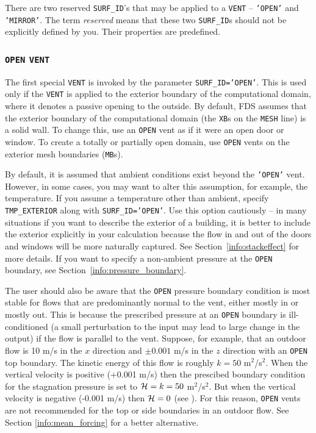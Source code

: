 \documentclass[11pt]{book}
\newcommand{\ct}{\tt\small}
\begin{document}
There are two reserved {\ct SURF\_ID}'s that may be applied to a {\ct VENT} -- {\ct 'OPEN'} and {\ct 'MIRROR'}. The term {\em reserved} means that these two
{\ct SURF\_ID}s should not be explicitly defined by you. Their properties are predefined.

\subsubsection{\texorpdfstring{{\tt OPEN}}{OPEN} \texorpdfstring{{\tt VENT}}{VENT}}

The first special {\ct VENT} is invoked by the parameter {\ct SURF\_ID='OPEN'}. This is used only if the {\ct VENT} is applied to the exterior boundary of the computational domain, where it denotes a passive opening to the outside. By default, FDS assumes that the exterior boundary of the computational domain (the {\ct XB}s on the {\ct MESH} line) is a solid wall. To change this, use an {\ct OPEN} vent as if it were an open door or window. To create a totally or partially open domain, use {\ct OPEN} vents on the exterior mesh boundaries ({\ct MB}s).

By default, it is assumed that ambient conditions exist beyond the {\ct 'OPEN'} vent. However, in some cases, you may want to alter this assumption, for example, the temperature. If you assume a temperature other than ambient, specify {\ct TMP\_EXTERIOR} along with {\ct SURF\_ID='OPEN'}. Use this option cautiously -- in many situations if you want to describe the exterior of a building, it is better to include the exterior explicitly in your calculation because the flow in and out of the doors and windows will be more naturally captured. See Section~\ref{info:stackeffect} for more details. If you want to specify a non-ambient pressure at the {\ct OPEN} boundary, see Section~\ref{info:pressure_boundary}.

The user should also be aware that the {\ct OPEN} pressure boundary condition is most stable for flows that are predominantly normal  to the vent, either mostly in or mostly out.  This is because the prescribed pressure at an {\ct OPEN} boundary is ill-conditioned (a small perturbation to the input may lead to large change in the output) if the flow is parallel to the vent.  Suppose, for example, that an outdoor flow is 10 m/s in the $x$ direction and $\pm 0.001$ m/s in the $z$ direction with an {\ct OPEN} top boundary.  The kinetic energy of this flow is roughly $k=50$ m$^2$/s$^2$.  When the vertical velocity is positive (+0.001 m/s) then the prescibed boundary condition for the stagnation pressure is set to ${\cal H} = k = 50$ m$^2$/s$^2$.  But when the vertical velocity is negative (-0.001 m/s) then ${\cal H} = 0$ (see \cite{FDS_Tech_Guide}).  For this reason, {\ct OPEN} vents are not recommended for the top or side boundaries in an outdoor flow.  See Section \ref{info:mean_forcing} for a better alternative.
\end{document}
